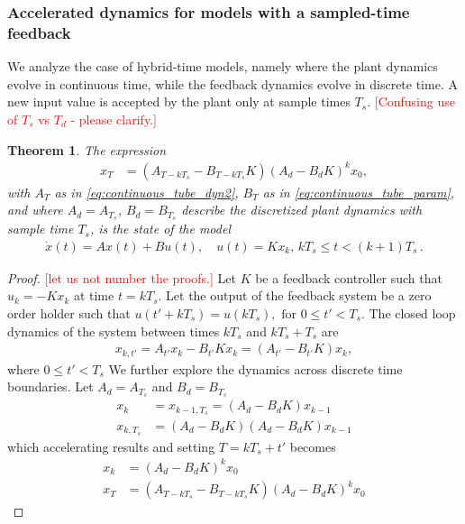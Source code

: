 \documentclass[twocolumn]{autart}    %
\newcommand{\mat}[1]{{#1}}
\renewcommand{\vec}[1]{{#1}}
\newtheorem{theorem}{Theorem}
\newtheorem{proof}{Proof}
\renewcommand{\note}[1]{\textcolor{red}{[#1]}}
\begin{document}
\subsubsection{Accelerated dynamics for models with a sampled-time feedback}\label{sec:real_discrete_feedback_inputs}

We analyze the case of hybrid-time models, 
namely where the plant dynamics evolve in continuous time, 
while the feedback dynamics evolve in discrete time.  
A new input value is accepted by the plant only at sample times $T_s$. \note{Confusing use of $T_s$ vs $T_d$ - please clarify.} 
%
\begin{theorem}
The expression
%
 \begin{align}
 \vec{x}_{T} &= (\mat{A}_{T-kT_s}-\mat{B}_{T-kT_s}\mat{K}) (\mat{A}_d-\mat{B}_d\mat{K})^k\vec{x}_0, 
 \label{eq:cyber_feedback}
 \end{align}
%
with $\mat{A}_T$ as in \eqref{eq:continuous_tube_dyn2}, $\mat{B}_T$ as in
\eqref{eq:continuous_tube_param}, and where $\mat{A}_d=\mat{A}_{T_s}$,
$\mat{B}_d=\mat{B}_{T_s}$ describe the discretized plant dynamics with
sample time $T_s$, is the state of the model
%
\begin{align*}
 \dot{\vec{x}}(t) = \mat{A}\vec{x}(t)+\mat{B}\vec{u}(t), \quad 
 \vec{u}(t)=\mat{K}\vec{x}_k,  \,
 kT_s \leq t < (k+1)T_s \,. 
\end{align*}
%
\end{theorem}
\begin{proof}
\note{let us not number the proofs.}
%
Let $\mat{K}$ be a feedback controller such that
$\vec{u}_k=-\mat{K}\vec{x}_k$ at time $t=kT_s$.  Let the output of the
feedback system be a zero order holder such that
$\vec{u}(t'+kT_s)=\vec{u}(kT_s), \text{ for } 0 \leq t' < T_s$.  The closed
loop dynamics of the system between times $kT_s$ and $kT_s+T_s$ are
%
\begin{align*}
\vec{x}_{k,t'}=\mat{A}_{t'}\vec{x}_k-\mat{B}_{t'}\mat{K}\vec{x}_k = (\mat{A}_{t'}-\mat{B}_{t'}\mat{K})\vec{x}_k,
\end{align*}
where $0 \leq t' < T_s$
We further explore the dynamics across discrete time boundaries. Let $\mat{A}_d=\mat{A}_{T_s}$ and $\mat{B}_d=\mat{B}_{T_s}$
\begin{align*}
\vec{x}_{k}&=\vec{x}_{k-1,T_s}= (\mat{A}_d-\mat{B}_d\mat{K})\vec{x}_{k-1}\\
\vec{x}_{k,T_s} &= (\mat{A}_d-\mat{B}_d\mat{K}) (\mat{A}_d-\mat{B}_d\mat{K})\vec{x}_{k-1}
\end{align*}
which accelerating results and setting $T=kT_s+t'$ becomes
\begin{align}
\label{eq:feedback_sampled_cont}
\vec{x}_{k} &= (\mat{A}_d-\mat{B}_d\mat{K}) ^k\vec{x}_0\\
\vec{x}_{T} &= (\mat{A}_{T-kT_s}-\mat{B}_{T-kT_s}\mat{K}) (\mat{A}_d-\mat{B}_d\mat{K})^k\vec{x}_0
\label{eq:feedback_cont}
\end{align}
\end{proof}
\end{document}
